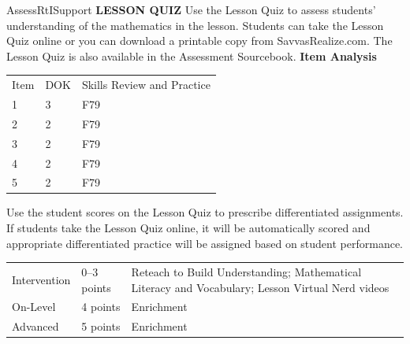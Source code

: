 \documentclass{article}
\newenvironment{te-addendum}[2]{}{}     %
\begin{document}
\begin{te-addendum}{Assess}{RtISupport}
\textbf{LESSON QUIZ}
Use the Lesson Quiz to assess students' understanding of the mathematics in the lesson.
Students can take the Lesson Quiz online or you can download a printable copy from SavvasRealize.com. The Lesson Quiz is also available in the Assessment Sourcebook.
\textbf{Item Analysis}
\begin{tabular}{lll}
Item & DOK & Skills Review and Practice \\
1 & 3 & F79 \\
2 & 2 & F79 \\
3 & 2 & F79 \\
4 & 2 & F79 \\
5 & 2 & F79 \\
\end{tabular}
Use the student scores on the Lesson Quiz to prescribe differentiated assignments.
If students take the Lesson Quiz online, it will be automatically scored and appropriate differentiated practice will be assigned based on student performance.
\begin{tabular}{lll}
Intervention & 0--3 points & Reteach to Build Understanding; Mathematical Literacy and Vocabulary; Lesson Virtual Nerd videos \\
On-Level & 4 points & Enrichment \\
Advanced & 5 points & Enrichment \\
\end{tabular}
\end{te-addendum}
\end{document}
